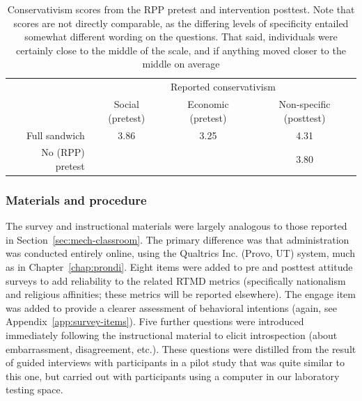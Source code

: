 \begin{table}
    \caption{Conservativism scores from the RPP pretest and intervention
        posttest. Note that scores are not directly comparable, as the
        differing levels of specificity entailed somewhat different wording on
        the questions. That said, individuals were certainly close to the middle
        of the scale, and if anything moved closer to the middle on average}
    \label{table:mech-rpp-cons}
\centering
\begin{tabular}{rccc}
  \toprule
   & \multicolumn{3}{c}{Reported conservativism} \\
   & Social (pretest) & Economic (pretest) & Non-specific (posttest) \\
  \midrule
  Full sandwich & 3.86 & 3.25 & 4.31 \\
  No (RPP) pretest & & & 3.80 \\
  \bottomrule
\end{tabular}
\end{table}

\subsubsection{Materials and procedure}

The survey and instructional materials were largely analogous to those reported
in Section~\ref{sec:mech-classroom}.  The primary difference was that
administration was conducted entirely online, using the Qualtrics Inc. (Provo,
UT) system, much as in Chapter~\ref{chap:prondi}. Eight items were added to pre
and posttest attitude surveys to add reliability to the related RTMD metrics
(specifically nationalism and religious affinities; these metrics will be
reported elsewhere). The \textsf{engage} item was added to provide a clearer
assessment of behavioral intentions (again, see
Appendix~\ref{app:survey-items}). Five further questions were introduced
immediately following the instructional material to elicit introspection (about
embarrassment, disagreement, etc.). These questions were distilled from the
result of guided interviews with participants in a pilot study that was quite
similar to this one, but carried out with participants using a computer in our
laboratory testing space.

